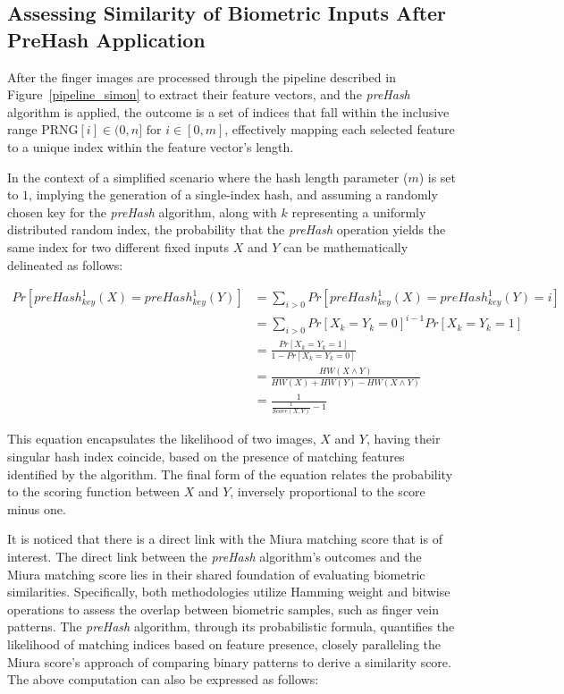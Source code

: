 \subsection{Assessing Similarity of Biometric Inputs After PreHash Application}
\label{sec:mu}

After the finger images are processed through the pipeline described in Figure~\ref{pipeline_simon} to extract their feature vectors, and the \textit{preHash} algorithm is applied, the outcome is a set of indices that fall within the inclusive range \(\text{PRNG}[i] \in (0, n] \text{ for } i \in [0, m]\), effectively mapping each selected feature to a unique index within the feature vector's length.

In the context of a simplified scenario where the hash length parameter (\(m\)) is set to \(1\), implying the generation of a single-index hash, and assuming a randomly chosen key for the \textit{preHash} algorithm, along with \(k\) representing a uniformly distributed random index, the probability that the \textit{preHash} operation yields the same index for two different fixed inputs \(X\) and \(Y\) can be mathematically delineated as follows:


\begin{equation} \label{eq:preHash1}
    \begin{aligned}
        Pr[preHash_{key}^1(X) = preHash_{key}^1(Y)] &= \sum_{i > 0} Pr[preHash_{key}^1(X) = preHash_{key}^1(Y) = i]\\
        &= \sum_{i > 0} Pr[X_k = Y_k = 0]^{i - 1} Pr[X_k = Y_k = 1]\\
        &= \frac{Pr[X_k = Y_k = 1]}{1 - Pr[X_k = Y_k = 0]}\\
        &= \frac{HW(X \land Y)}{HW(X) + HW(Y) - HW(X \land Y)}\\
        &= \frac{1}{\frac{1}{Score(X, Y)} - 1}
    \end{aligned}
\end{equation}

This equation encapsulates the likelihood of two images, \(X\) and \(Y\), having their singular hash index coincide, based on the presence of matching features identified by the algorithm. The final form of the equation relates the probability to the scoring function between \(X\) and \(Y\), inversely proportional to the score minus one.

It is noticed that there is a direct link with the Miura matching score that is of interest. The direct link between the \textit{preHash} algorithm's outcomes and the Miura matching score lies in their shared foundation of evaluating biometric similarities. Specifically, both methodologies utilize Hamming weight and bitwise operations to assess the overlap between biometric samples, such as finger vein patterns. The \textit{preHash} algorithm, through its probabilistic formula, quantifies the likelihood of matching indices based on feature presence, closely paralleling the Miura score's approach of comparing binary patterns to derive a similarity score. The above computation can also be expressed as follows:

